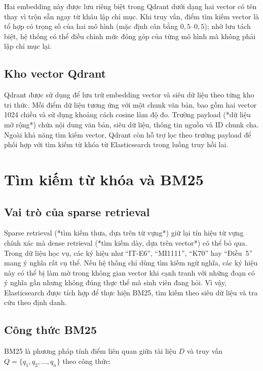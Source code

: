 \documentclass[../DoAn.tex]{subfiles}
\begin{document}
Hai embedding này được lưu riêng biệt trong Qdrant dưới dạng hai vector có tên
thay vì trộn sẵn ngay từ khâu lập chỉ mục. Khi truy vấn, điểm tìm kiếm vector
là tổ hợp có trọng số của hai mô hình (mặc định cân bằng $0{,}5$--$0{,}5$); nhờ
lưu tách biệt, hệ thống có thể điều chỉnh mức đóng góp của từng mô hình mà không
phải lập chỉ mục lại.

\subsection{Kho vector Qdrant}

Qdrant được sử dụng để lưu trữ embedding vector và siêu dữ liệu theo từng kho
tri thức. Mỗi điểm dữ liệu tương ứng với một chunk văn bản, bao gồm hai vector
1024 chiều và sử dụng khoảng cách cosine làm độ đo. Trường payload (*dữ liệu
mở rộng*) chứa nội dung văn bản, siêu dữ liệu, thông tin nguồn và ID chunk cha.
Ngoài khả năng tìm kiếm vector, Qdrant còn hỗ trợ lọc theo trường payload để
phối hợp với tìm kiếm từ khóa từ Elasticsearch trong luồng truy hồi lai.

\section{Tìm kiếm từ khóa và BM25}

\subsection{Vai trò của sparse retrieval}

Sparse retrieval (*tìm kiếm thưa, dựa trên từ vựng*) giữ lại tín hiệu từ vựng
chính xác mà dense retrieval (*tìm kiếm dày, dựa trên vector*) có thể bỏ qua.
Trong dữ liệu học vụ, các ký hiệu như ``IT-E6'', ``MI1111'', ``K70'' hay
``Điều~5'' mang ý nghĩa rất cụ thể. Nếu hệ thống chỉ dùng tìm kiếm ngữ nghĩa,
các ký hiệu này có thể bị làm mờ trong không gian vector khi cạnh tranh với
những đoạn có ý nghĩa gần nhưng không đúng thực thể mà sinh viên đang hỏi. Vì
vậy, Elasticsearch được tích hợp để thực hiện BM25, tìm kiếm theo siêu dữ liệu
và tra cứu theo định danh.

\subsection{Công thức BM25}

BM25 \cite{bm25} là phương pháp tính điểm liên quan giữa tài liệu $D$ và truy vấn $Q =
\{q_1, q_2, ..., q_n\}$ theo công thức:
\end{document}
